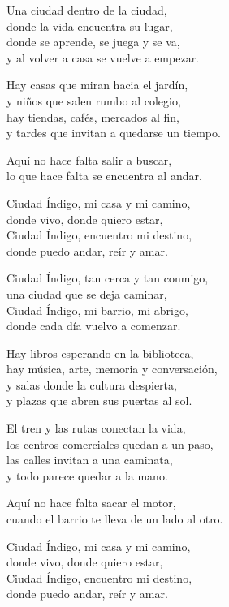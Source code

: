 \begin{lyrics}
Una ciudad dentro de la ciudad,\\
donde la vida encuentra su lugar,\\
donde se aprende, se juega y se va,\\
y al volver a casa se vuelve a empezar.

Hay casas que miran hacia el jardín,\\
y niños que salen rumbo al colegio,\\
hay tiendas, cafés, mercados al fin,\\
y tardes que invitan a quedarse un tiempo.

Aquí no hace falta salir a buscar,\\
lo que hace falta se encuentra al andar.

Ciudad Índigo, mi casa y mi camino,\\
donde vivo, donde quiero estar,\\
Ciudad Índigo, encuentro mi destino,\\
donde puedo andar, reír y amar.

Ciudad Índigo, tan cerca y tan conmigo,\\
una ciudad que se deja caminar,\\
Ciudad Índigo, mi barrio, mi abrigo,\\
donde cada día vuelvo a comenzar.

Hay libros esperando en la biblioteca,\\
hay música, arte, memoria y conversación,\\
y salas donde la cultura despierta,\\
y plazas que abren sus puertas al sol.

El tren y las rutas conectan la vida,\\
los centros comerciales quedan a un paso,\\
las calles invitan a una caminata,\\
y todo parece quedar a la mano.

Aquí no hace falta sacar el motor,\\
cuando el barrio te lleva de un lado al otro.

Ciudad Índigo, mi casa y mi camino,\\
donde vivo, donde quiero estar,\\
Ciudad Índigo, encuentro mi destino,\\
donde puedo andar, reír y amar.


\end{lyrics}
